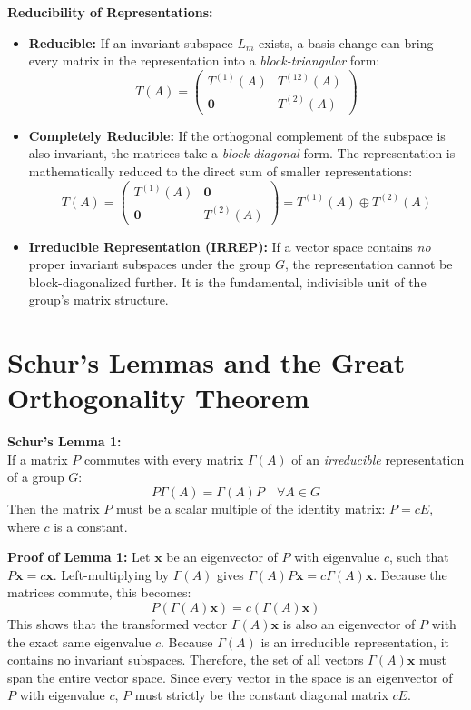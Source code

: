 \documentclass[11pt, a4paper]{report}
\begin{document}
\textbf{Reducibility of Representations:}\\
\begin{itemize}
    \item \textbf{Reducible:} If an invariant subspace $L_m$ exists, a basis change can bring every matrix in the representation into a \textit{block-triangular} form:
    \[ T(A) = \begin{pmatrix} T^{(1)}(A) & T^{(12)}(A) \\ \mathbf{0} & T^{(2)}(A) \end{pmatrix} \]
    \item \textbf{Completely Reducible:} If the orthogonal complement of the subspace is also invariant, the matrices take a \textit{block-diagonal} form. The representation is mathematically reduced to the direct sum of smaller representations:
    \[ T(A) = \begin{pmatrix} T^{(1)}(A) & \mathbf{0} \\ \mathbf{0} & T^{(2)}(A) \end{pmatrix} = T^{(1)}(A) \oplus T^{(2)}(A) \]
    \item \textbf{Irreducible Representation (IRREP):} If a vector space contains \textit{no} proper invariant subspaces under the group $G$, the representation cannot be block-diagonalized further. It is the fundamental, indivisible unit of the group's matrix structure.
\end{itemize}
\section{Schur's Lemmas and the Great Orthogonality Theorem}

\textbf{Schur's Lemma 1:}\\
If a matrix $P$ commutes with every matrix $\Gamma(A)$ of an \textit{irreducible} representation of a group $G$:
\[ P \Gamma(A) = \Gamma(A) P \quad \forall A \in G \]
Then the matrix $P$ must be a scalar multiple of the identity matrix: $P = cE$, where $c$ is a constant.

\textbf{Proof of Lemma 1:} Let $\mathbf{x}$ be an eigenvector of $P$ with eigenvalue $c$, such that $P\mathbf{x} = c\mathbf{x}$. Left-multiplying by $\Gamma(A)$ gives $\Gamma(A)P\mathbf{x} = c\Gamma(A)\mathbf{x}$. Because the matrices commute, this becomes:
\[ P (\Gamma(A)\mathbf{x}) = c (\Gamma(A)\mathbf{x}) \]
This shows that the transformed vector $\Gamma(A)\mathbf{x}$ is also an eigenvector of $P$ with the exact same eigenvalue $c$. Because $\Gamma(A)$ is an irreducible representation, it contains no invariant subspaces. Therefore, the set of all vectors $\Gamma(A)\mathbf{x}$ must span the entire vector space. Since every vector in the space is an eigenvector of $P$ with eigenvalue $c$, $P$ must strictly be the constant diagonal matrix $cE$.
\end{document}
